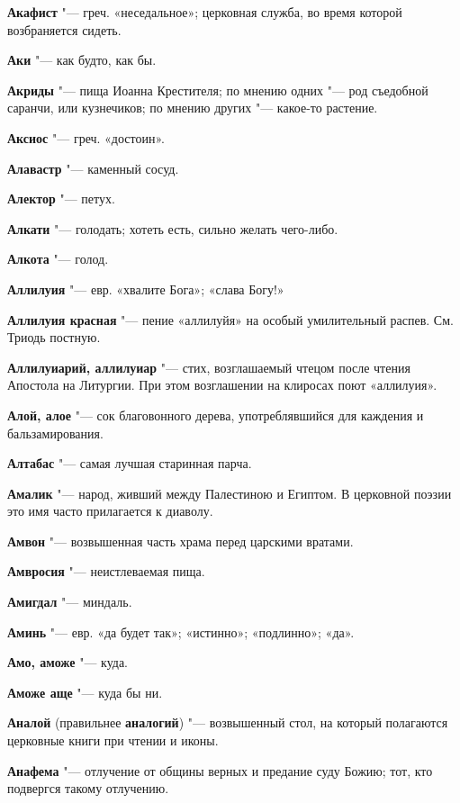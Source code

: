 \begin{mymulticols}
\noindent\textbf{Акафист} "--- греч. «неседальное»; церковная служба, во время которой возбраняется сидеть. 

\noindent\textbf{Аки} "--- как будто, как бы. 

\noindent\textbf{Акриды} "--- пища Иоанна Крестителя; по мнению одних "--- род съедобной саранчи, или кузнечиков; по мнению других "--- какое-то растение. 

\noindent\textbf{Аксиос} "--- греч. «достоин». 

\noindent\textbf{Алавастр} "--- каменный сосуд. 

\noindent\textbf{Алектор} "--- петух. 

\noindent\textbf{Алкати} "--- голодать; хотеть есть, сильно желать чего-либо. 

\noindent\textbf{Алкота} "--- голод. 

\noindent\textbf{Аллилуия} "--- евр. «хвалите Бога»; «слава Богу!» 

\noindent\textbf{Аллилуия красная} "--- пение «аллилуйя» на особый умилительный распев. См. Триодь постную. 

\noindent\textbf{Аллилуиарий, аллилуиар} "--- стих, возглашаемый чтецом после чтения Апостола на Литургии. При этом возглашении на клиросах поют «аллилуия». 

\noindent\textbf{Алой, алое} "--- сок благовонного дерева, употреблявшийся для каждения и бальзамирования. 

\noindent\textbf{Алтабас} "--- самая лучшая старинная парча. 

\noindent\textbf{Амалик} "--- народ, живший между Палестиною и Египтом. В церковной поэзии это имя часто прилагается к диаволу. 

\noindent\textbf{Амвон} "--- возвышенная часть храма перед царскими вратами. 

\noindent\textbf{Амвросия} "--- неистлеваемая пища. 

\noindent\textbf{Амигдал} "--- миндаль. 

\noindent\textbf{Аминь} "--- евр. «да будет так»; «истинно»; «подлинно»; «да». 

\noindent\textbf{Амо, аможе} "--- куда. 

\noindent\textbf{Аможе аще} "--- куда бы ни. 

\noindent\textbf{Аналой} (правильнее \noindent\textbf{аналогий}) "--- возвышенный стол, на который полагаются церковные книги при чтении и иконы. 

\noindent\textbf{Анафема} "--- отлучение от общины верных и предание суду Божию; тот, кто подвергся такому отлучению. 


\end{mymulticols}

